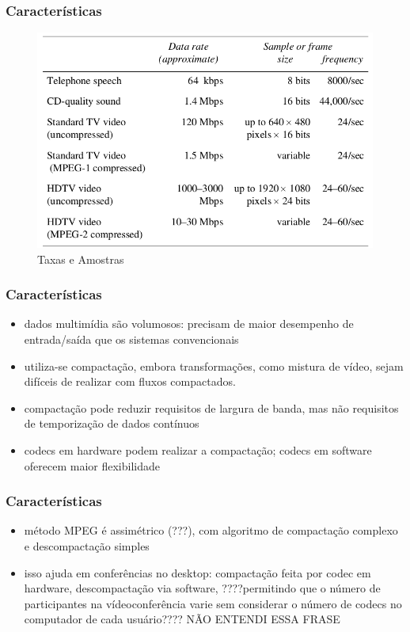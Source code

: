 \documentclass[]{beamer}
\begin{document}
\begin{frame}
  \frametitle{Características}
  \begin{figure}[hbtp]
   \caption{Taxas e Amostras}
   \begin{center}
    \includegraphics[scale=0.33]{taxas_e_amostras.png}
   \end{center}
  \end{figure}
\end{frame}

\begin{frame}
  \frametitle{Características}
\begin{itemize}
\item dados multimídia são volumosos: precisam de maior desempenho de entrada/saída que os
sistemas convencionais
  \item utiliza-se compactação, embora transformações, como mistura de vídeo, sejam 
difíceis de realizar com fluxos compactados.
  \item compactação pode reduzir requisitos de largura de banda, mas não requisitos de
temporização de dados contínuos
  \item codecs em hardware podem realizar a compactação; codecs em software oferecem
maior flexibilidade
\end{itemize}
\end{frame}

\begin{frame}
  \frametitle{Características}
\begin{itemize}
  \item método MPEG é assimétrico (???), com algoritmo de compactação complexo e descompactação
simples
  \item isso ajuda em conferências no desktop: compactação feita por codec em hardware, 
descompactação via software, ????permitindo que o número de participantes na
vídeoconferência varie sem considerar o número de 
codecs no computador de cada usuário???? NÃO ENTENDI ESSA FRASE
\end{itemize}
\end{frame}
\end{document}
